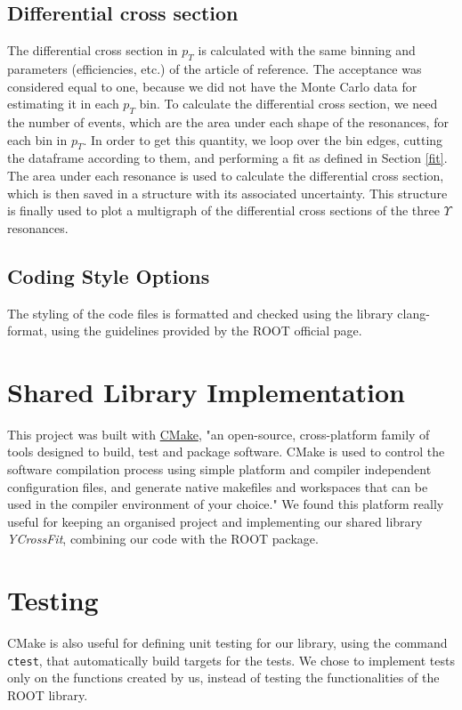 \documentclass{article}
\begin{document}
\subsection{Differential cross section}
The differential cross section in $p_T$ is calculated with the same binning and parameters (efficiencies, etc.) of the article of reference. The acceptance was considered equal to one, because we did not have the Monte Carlo data for estimating it in each $p_T$ bin. 
To calculate the differential cross section, we need the number of events, which are the area under each shape of the resonances, for each bin in $p_T$. In order to get this quantity, we loop over the bin edges, cutting the dataframe according to them, and performing a fit as defined in Section \ref{fit}. The area under each resonance is used to calculate the differential cross section, which is then saved in a structure with its associated uncertainty. This structure is finally used to plot a multigraph of the differential cross sections of the three $\Upsilon$ resonances.

\subsection{Coding Style Options}
The styling of the code files is formatted and checked using the library clang-format, using the guidelines provided by the ROOT official page.

\section{Shared Library Implementation}
This project was built with \href{https://cmake.org}{CMake}, "an open-source, cross-platform family of tools designed to build, test and package software. CMake is used to control the software compilation process using simple platform and compiler independent configuration files, and generate native makefiles and workspaces that can be used in the compiler environment of your choice."
We found this platform really useful for keeping an organised project and implementing our shared library \textit{YCrossFit}, combining our code with the ROOT package.

\section{Testing}
CMake is also useful for defining unit testing for our library, using the command \texttt{ctest}, that automatically build targets for the tests. 
We chose to implement tests only on the functions created by us, instead of testing the functionalities of the ROOT library.
\end{document}
